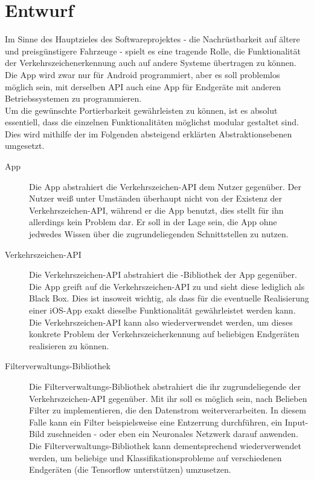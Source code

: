 \documentclass[12pt,a4paper,ngerman,enabledeprecatedfontcommands]{scrreprt}
\begin{document}
\chapter{Entwurf}
Im Sinne des Hauptzieles des Softwareprojektes - die Nachrüstbarkeit auf ältere und preis\-günstigere Fahrzeuge - spielt es eine tragende Rolle, die Funktionalität der Verkehrszeichenerkennung auch auf andere Systeme übertragen zu können. Die \gls{App} wird zwar nur für Android programmiert, aber es soll problemlos möglich sein, mit derselben \gls{API} auch eine \gls{App} für Endgeräte mit anderen Betriebssystemen zu programmieren.\\
Um die gewünschte Portierbarkeit gewährleisten zu können, ist es absolut essentiell, dass die einzelnen Funktionalitäten möglichst modular gestaltet sind. Dies wird mithilfe der im Folgenden absteigend erklärten Abstraktionsebenen umgesetzt.

\begin{description}
\item[App] Die \gls{App} abstrahiert die \gls{Verkehrszeichen-API} dem \gls{Nutzer} gegenüber. Der \gls{Nutzer} weiß unter Umständen überhaupt nicht von der Existenz der \gls{Verkehrszeichen-API}, während er die \gls{App} benutzt, dies stellt für ihn allerdings kein Problem dar. Er soll in der Lage sein, die \gls{App} ohne jedwedes Wissen über die zugrundeliegenden Schnittstellen zu nutzen.

\item[Verkehrszeichen-API] Die \gls{Verkehrszeichen-API} abstrahiert die -Bib\-liothek der \gls{App} gegenüber. Die \gls{App} greift auf die \gls{Verkehrszeichen-API} zu und sieht diese lediglich als Black Box. Dies ist insoweit wichtig, als dass für die eventuelle Realisierung einer iOS-\gls{App} exakt dieselbe Funktionalität gewährleistet werden kann.\\
Die \gls{Verkehrszeichen-API} kann also wiederverwendet werden, um dieses konkrete Problem der Verkehrszeicherkennung auf beliebigen Endgeräten realisieren zu können.

\item[Filterverwaltungs-Bibliothek] Die \gls{Filterverwaltungs-Bibliothek} abstrahiert die ihr zugrundeliegende  der \gls{Verkehrszeichen-API} gegenüber. Mit ihr soll es möglich sein, nach Belieben Filter zu implementieren, die den Datenstrom weiterverarbeiten. In diesem Falle kann ein Filter beispielsweise eine Entzerrung durchführen, ein Input-Bild zuschneiden - oder eben ein \gls{Neuronales Netzwerk} darauf anwenden.\\
Die \gls{Filterverwaltungs-Bibliothek} kann dementsprechend wiederverwendet werden, um beliebige  und \gls{Klassifikation}sprobleme auf verschiedenen Endgeräten (die Tensorflow unterstützen) umzusetzen.

\end{description}
\end{document}
